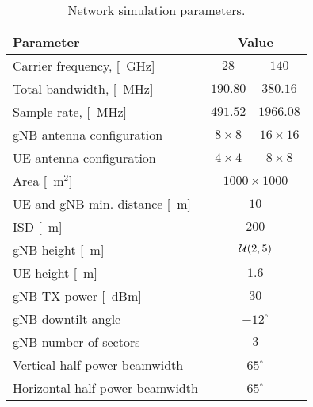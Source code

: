 \begin{table}[t]
    \centering
    \caption{Network simulation parameters.}
    \setlength{\tabcolsep}{3pt}
    \label{tab:sim_param}
    \begin{tabular}{|>{\raggedright}m{1.6in}|c|c|}
        \hline
        \textbf{Parameter} & \multicolumn{2}{c|}{\textbf{Value}}
        \tabularnewline \hline
      
        Carrier frequency, [\SI{}{\GHz}] & $28$ & $140$
        \tabularnewline
        
        Total bandwidth, [\SI{}{\MHz}] & $190.80$ & $380.16$
        \tabularnewline 
        
        Sample rate, %
        [\SI{}{\MHz}] & $491.52$ & $1966.08$
        \tabularnewline 
        
        gNB antenna configuration &{$8\times8$} & {$16\times16$}
        \tabularnewline
        UE antenna configuration &{$4\times4$}& {$8\times8$}
        \tabularnewline \cline{2-3}
        
        Area [\SI{}{\meter}$^2$]  &  \multicolumn{2}{c|}{$1000 \times 1000 $}
        \tabularnewline
        
        UE and gNB min. distance [\SI{}{\meter}] &  \multicolumn{2}{c|}{$10$}
        \tabularnewline
        
        ISD [\SI{}{\meter}] & \multicolumn{2}{c|}{$200$}
        \tabularnewline
        
        gNB height [\SI{}{\meter}] &  \multicolumn{2}{c|}{${\mathcal{U}}(2,5)$}
        \tabularnewline
        
        UE height [\SI{}{\meter}] &  \multicolumn{2}{c|}{$1.6$}
        \tabularnewline
        
        gNB TX power [\SI{}{dBm}] & \multicolumn{2}{c|}{$30$}
        \tabularnewline
        
        gNB downtilt angle & \multicolumn{2}{c|}{$-12^\circ$}
        \tabularnewline
        
        gNB number of sectors & \multicolumn{2}{c|}{$3$}
        \tabularnewline
        
        Vertical half-power beamwidth %
        & \multicolumn{2}{c|}{$65^\circ$}
        \tabularnewline
        
        Horizontal half-power beamwidth %
        & \multicolumn{2}{c|}{$65^\circ$}
        \tabularnewline \hline
    \end{tabular}
\end{table}


